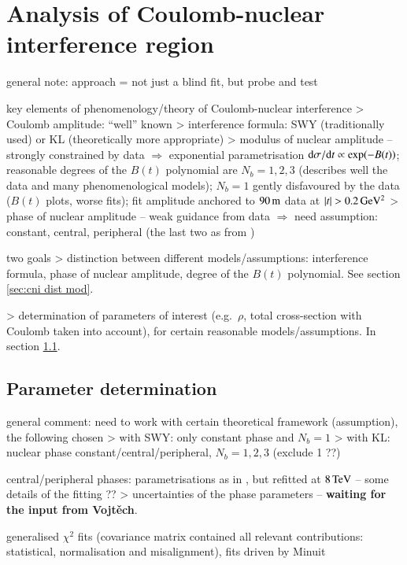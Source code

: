 \section{Analysis of Coulomb-nuclear interference region}
\label{sec:cni}

\> general note: approach = not just a blind fit, but probe and test

\> key elements of phenomenology/theory of Coulomb-nuclear interference
\>> Coulomb amplitude: ``well'' known
\>> interference formula: SWY (traditionally used) or KL (theoretically more appropriate)
\>> modulus of nuclear amplitude -- strongly constrained by data $\Rightarrow$ exponential parametrisation ${\rm d}\sigma / {\rm d} t \propto \exp( -B(t) )$; reasonable degrees of the $B(t)$ polynomial are $N_b = 1, 2, 3$ (describes well the data and many phenomenological models); $N_b = 1$ gently disfavoured by the data ($B(t)$ plots, worse fits); fit amplitude anchored to $90\,{\rm m}$ data at $|t| > 0.2\,{\rm GeV^2}$
\>> phase of nuclear amplitude -- weak guidance from data $\Rightarrow$ need assumption: constant, central, peripheral (the last two as from \cite{kl94})

\> two goals
\>> distinction between different models/assumptions: interference formula, phase of nuclear amplitude, degree of the $B(t)$ polynomial. See section \ref{sec:cni dist mod}.

\>> determination of parameters of interest (e.g.~$\rho$, total cross-section with Coulomb taken into account), for certain reasonable models/assumptions. In section \ref{sec:cni par det}.


\subsection{Parameter determination}
\label{sec:cni par det}

\> general comment: need to work with certain theoretical framework (assumption), the following chosen
\>> with SWY: only constant phase and $N_b = 1$
\>> with KL: nuclear phase constant/central/peripheral, $N_b = 1, 2, 3$ (exclude 1 ??)

\> central/peripheral phases: parametrisations as in \cite{kl94}, but refitted at $8\,{\rm TeV}$ -- some details of the fitting ??
\>> uncertainties of the phase parameters -- {\bf waiting for the input from Vojt\v ech}.


\> generalised $\chi^2$ fits (covariance matrix contained all relevant contributions: statistical, normalisation and misalignment), fits driven by Minuit

